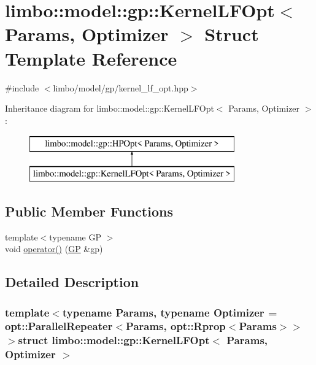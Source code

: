 \hypertarget{structlimbo_1_1model_1_1gp_1_1_kernel_l_f_opt}{}\section{limbo\+:\+:model\+:\+:gp\+:\+:Kernel\+L\+F\+Opt$<$ Params, Optimizer $>$ Struct Template Reference}
\label{structlimbo_1_1model_1_1gp_1_1_kernel_l_f_opt}


{\ttfamily \#include $<$limbo/model/gp/kernel\+\_\+lf\+\_\+opt.\+hpp$>$}

Inheritance diagram for limbo\+:\+:model\+:\+:gp\+:\+:Kernel\+L\+F\+Opt$<$ Params, Optimizer $>$\+:\begin{figure}[H]
\begin{center}
\leavevmode
\includegraphics[height=2.000000cm]{structlimbo_1_1model_1_1gp_1_1_kernel_l_f_opt}
\end{center}
\end{figure}
\subsection*{Public Member Functions}
\begin{DoxyCompactItemize}
\item 
{\footnotesize template$<$typename G\+P $>$ }\\void \hyperlink{structlimbo_1_1model_1_1gp_1_1_kernel_l_f_opt_af35e4e360f557fc34c4ea2bed3eeec28}{operator()} (\hyperlink{classlimbo_1_1model_1_1_g_p}{G\+P} \&gp)
\end{DoxyCompactItemize}


\subsection{Detailed Description}
\subsubsection*{template$<$typename Params, typename Optimizer = opt\+::\+Parallel\+Repeater$<$\+Params, opt\+::\+Rprop$<$\+Params$>$$>$$>$struct limbo\+::model\+::gp\+::\+Kernel\+L\+F\+Opt$<$ Params, Optimizer $>$}

